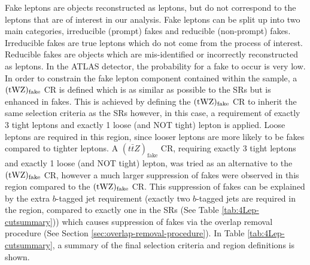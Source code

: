 Fake leptons are objects reconstructed as leptons, but do not correspond to the leptons that are of interest in our analysis. Fake leptons can be split up into two main categories, irreducible (prompt) fakes and reducible (non-prompt) fakes. Irreducible fakes are true leptons which do not come from the process of interest. Reducible fakes are objects which are mis-identified or incorrectly reconstructed as leptons. In the ATLAS detector, the probability for a fake to occur is very low. In order to constrain the fake lepton component contained within the \ttZ sample, a $(\tWZ)_{\text{fake}}$ CR is defined which is as similar as possible to the \tWZ SRs but is enhanced in fakes. This is achieved by defining the $(\tWZ)_{\text{fake}}$ CR to inherit the same selection criteria as the \tWZ SRs however, in this case, a requirement of exactly 3 tight leptons and exactly 1 loose (and NOT tight) lepton is applied. Loose leptons are required in this region, since looser leptons are more likely to be fakes compared to tighter leptons. A $(t\bar{t}Z)_{\text{fake}}$ CR, requiring exactly 3 tight leptons and exactly 1 loose (and NOT tight) lepton, was tried as an alternative to the $(\tWZ)_{\text{fake}}$ CR, however a much larger suppression of fakes were observed in this region compared to the $(\tWZ)_{\text{fake}}$ CR. This suppression of fakes can be explained by the extra $b$-tagged jet requirement (exactly two $b$-tagged jets are required in the \ttZ region, compared to exactly one in the \tWZ SRs (See Table \ref{tab:4Lep-cutsummary})) which causes suppression of fakes via the overlap removal procedure (See Section \ref{sec:overlap-removal-procedure}). In Table \ref{tab:4Lep-cutsummary}, a summary of the final selection criteria and region definitions is shown.
